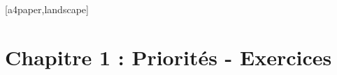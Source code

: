 

\newpage
{}[a4paper,landscape]%


\section*{Chapitre 1 : Priorités - Exercices}



% 





\vspace{-1em}




